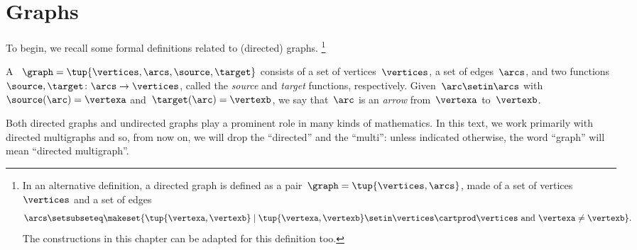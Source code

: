 
\section{Graphs}


To begin, we recall some formal definitions related to (directed) graphs.
\footnote{
    In an alternative definition, a directed graph is defined as a pair~$\graph=\tup{\vertices, \arcs}$, made of a set of vertices~$\vertices$ and a set of edges
    \begin{equation}
        \arcs \setsubseteq \makeset{ \tup{\vertexa, \vertexb} \mid \tup{\vertexa, \vertexb} \setin \vertices \cartprod \vertices \text{ and } \vertexa \neq \vertexb}.
    \end{equation}
    The constructions in this chapter can be adapted for this definition too.
}

\begin{definition}
    \label{def:Graph}
    A \emph{}~$\graph=\tup{\vertices,\arcs, \source,\target}$ consists of a set of vertices~$\vertices$, a set of edges~$\arcs$, and two functions~$\source,\target \colon \arcs \to \vertices$, called the \emph{source} and \emph{target} functions, respectively.
    Given~$\arc\setin \arcs$ with~$\source(\arc)=\vertexa$ and~$\target(\arc)=\vertexb$, we say that~$\arc$ is an \emph{arrow} from~$\vertexa$ to~$\vertexb$.
\end{definition}


\begin{remark}
    Both directed graphs and undirected graphs play a prominent role in many kinds of mathematics.
    In this text, we work primarily with directed multigraphs and so, from now on, we will drop the ``directed'' and the ``multi'': unless indicated otherwise, the word ``graph'' will mean ``directed multigraph''.
\end{remark}

